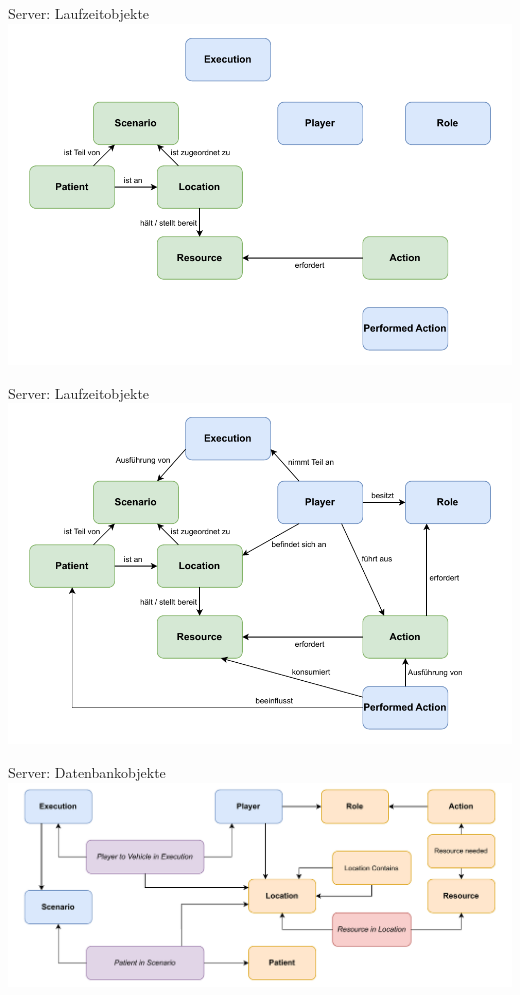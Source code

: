 \begin{frame}[noframenumbering]{Server: Laufzeitobjekte}
	\centering
	\includegraphics[height=.9\textheight]{images/server/laufzeit_objekte_3.pdf}
\end{frame}

\begin{frame}[noframenumbering]{Server: Laufzeitobjekte}
	\centering
	\includegraphics[height=.9\textheight]{images/server/laufzeit_objekte.pdf}
\end{frame}


\begin{frame}{Server: Datenbankobjekte}
	\centering
	\includegraphics[width=\textwidth]{images/server/datenbank_objekte.pdf}
\end{frame}
